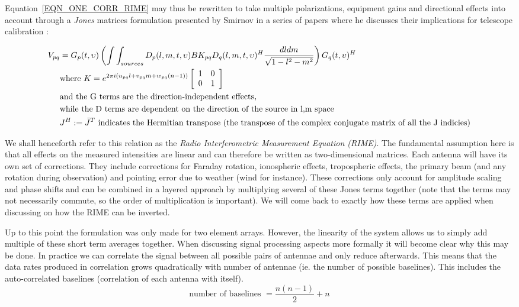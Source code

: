 Equation~\ref{EQN_ONE_CORR_RIME} may thus be rewritten to take multiple polarizations, equipment gains and directional effects into account through a \textit{Jones} matrices 
formulation presented by Smirnov in a series of papers where he discusses their implications for telescope calibration \cite{2011A&A...527A.106S,2011A&A...527A.107S,2011A&A...527A.108S,2011A&A...531A.159S}:

\begin{equation}
\label{eqn_RIME}
\begin{split}
    V_{pq} &= G_p(t,\upsilon)\left(\int\int_{sources}D_p(l,m,t,\upsilon)BK_{pq}D_q(l,m,t,\upsilon)^H\frac{dldm}{\sqrt{1-l^2-m^2}}\right)G_q(t,\upsilon)^H\\
	  &\text{where }K = e^{2\pi i(u_{pq}l+v_{pq}m+w_{pq}(n-1))}
    \left[\begin{array}{c c}
     1 & 0 \\
     0 & 1 \\
    \end{array}\right]\\
	 &\text{and the G terms are the direction-independent effects,}\\
 	 &\text{while the D terms are dependent on the direction of the source in l,m space}\\
 	 &J^H:=\bar J^T \text{ indicates the Hermitian transpose (the transpose of the complex conjugate matrix of all the J indicies)}\\ 
\end{split}
\end{equation}

We shall henceforth refer to this relation as the \textit{Radio Interferometric Measurement Equation (RIME)}. 
The fundamental assumption here is that all effects on the measured intensities are linear and can therefore be 
written as two-dimensional matrices. Each antenna will have its own set of corrections. They 
include corrections for Faraday rotation, ionospheric effects, tropospheric effects, the primary beam (and any rotation during
observation) and pointing error due to weather (wind for instance). These corrections only account for amplitude scaling and 
phase shifts and can be combined in a layered approach by multiplying several of these Jones terms together (note that the terms 
may not necessarily commute, so the order of multiplication is important). We will come back to exactly how these terms are applied
when discussing on how the RIME can be inverted.

Up to this point the formulation was only made for two element arrays. However, the linearity of the system allows us
to simply add multiple of these short term averages together. When discussing signal processing aspects more formally
it will become clear why this may be done. In practice we can correlate the signal between all possible pairs of 
antennae and only reduce afterwards. This means that the data rates produced in correlation grows quadratically with 
number of antennae (ie. the number of possible baselines). This includes the auto-correlated baselines (correlation 
of each antenna with itself).
\begin{equation}
  \text{number of baselines } = \frac{n(n-1)}{2} + n
\end{equation}

